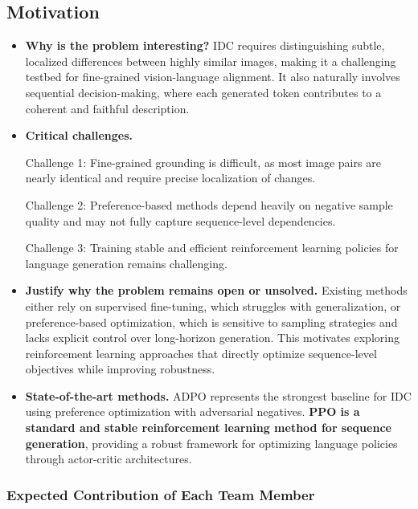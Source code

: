 \subsection{Motivation}
\begin{itemize}

\item \textbf{Why is the problem interesting?} IDC requires distinguishing subtle, localized differences between highly similar images, making it a challenging testbed for fine-grained vision-language alignment. It also naturally involves sequential decision-making, where each generated token contributes to a coherent and faithful description.

\item \textbf{Critical challenges.}

Challenge 1: Fine-grained grounding is difficult, as most image pairs are nearly identical and require precise localization of changes.

Challenge 2: Preference-based methods depend heavily on negative sample quality and may not fully capture sequence-level dependencies.

Challenge 3: Training stable and efficient reinforcement learning policies for language generation remains challenging.



\item \textbf{Justify why the problem remains open or unsolved.} Existing methods either rely on supervised fine-tuning, which struggles with generalization, or preference-based optimization, which is sensitive to sampling strategies and lacks explicit control over long-horizon generation. This motivates exploring reinforcement learning approaches that directly optimize sequence-level objectives while improving robustness.



\item \textbf{State-of-the-art methods.} ADPO represents the strongest baseline for IDC using preference optimization with adversarial negatives. \textbf{PPO is a standard and stable reinforcement learning method for sequence generation}, providing a robust framework for optimizing language policies through actor-critic architectures.

\end{itemize}

\subsubsection*{Expected Contribution of Each Team Member}

